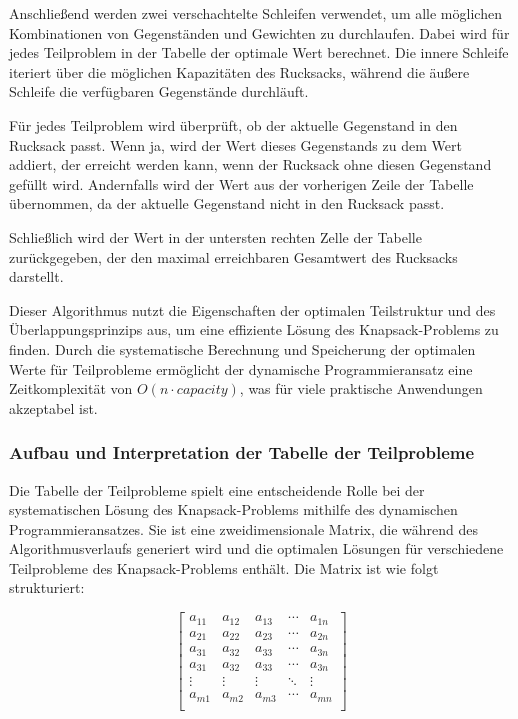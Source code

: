 Anschließend werden zwei verschachtelte Schleifen verwendet, um alle möglichen Kombinationen von Gegenständen und Gewichten
zu durchlaufen. Dabei wird für jedes Teilproblem in der Tabelle der optimale Wert berechnet. Die innere Schleife iteriert
über die möglichen Kapazitäten des Rucksacks, während die äußere Schleife die verfügbaren Gegenstände durchläuft.

Für jedes Teilproblem wird überprüft, ob der aktuelle Gegenstand in den Rucksack passt. Wenn ja, wird der Wert dieses
Gegenstands zu dem Wert addiert, der erreicht werden kann, wenn der Rucksack ohne diesen Gegenstand gefüllt wird. Andernfalls
wird der Wert aus der vorherigen Zeile der Tabelle übernommen, da der aktuelle Gegenstand nicht in den Rucksack passt.

Schließlich wird der Wert in der untersten rechten Zelle der Tabelle zurückgegeben, der den maximal erreichbaren Gesamtwert
des Rucksacks darstellt.

Dieser Algorithmus nutzt die Eigenschaften der optimalen Teilstruktur und des Überlappungsprinzips aus, um eine effiziente
Lösung des Knapsack-Problems zu finden. Durch die systematische Berechnung und Speicherung der optimalen Werte für Teilprobleme
ermöglicht der dynamische Programmieransatz eine Zeitkomplexität von \( O(n \cdot capacity) \), was für viele praktische
Anwendungen akzeptabel ist.


\subsubsection*{Aufbau und Interpretation der Tabelle der Teilprobleme}
Die Tabelle der Teilprobleme spielt eine entscheidende Rolle bei der systematischen Lösung des Knapsack-Problems mithilfe
des dynamischen Programmieransatzes. Sie ist eine zweidimensionale Matrix, die während des Algorithmusverlaufs generiert
wird und die optimalen Lösungen für verschiedene Teilprobleme des Knapsack-Problems enthält. Die Matrix ist wie folgt strukturiert:

\[
\left[
\begin{array}{ccccc}
a_{11} & a_{12} & a_{13} & \cdots & a_{1n} \\
a_{21} & a_{22} & a_{23} & \cdots & a_{2n} \\
a_{31} & a_{32} & a_{33} & \cdots & a_{3n} \\
a_{31} & a_{32} & a_{33} & \cdots & a_{3n} \\
\vdots & \vdots & \vdots & \ddots & \vdots \\
a_{m1} & a_{m2} & a_{m3} & \cdots & a_{mn} \\
\end{array}
\right]
\]

